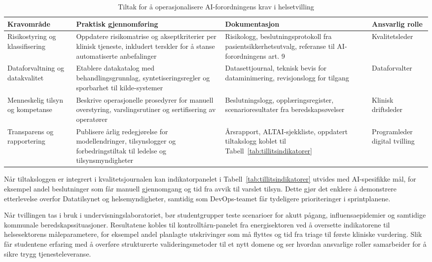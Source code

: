\begin{table}[ht]
    \centering
    \caption{Tiltak for å operasjonalisere AI-forordningens krav i helsetvilling}
    \label{tab:aiforordning-tiltak}
    \begin{tabular}{|p{3.3cm}|p{4.5cm}|p{4.5cm}|p{3.0cm}|}
        \hline
        \textbf{Kravområde} & \textbf{Praktisk gjennomføring} & \textbf{Dokumentasjon} & \textbf{Ansvarlig rolle} \\
        \hline
        Risikostyring og klassifisering & Oppdatere risikomatrise og akseptkriterier per klinisk tjeneste, inkludert terskler for å stanse automatiserte anbefalinger & Risikologg, beslutningsprotokoll fra pasientsikkerhetsutvalg, referanse til AI-forordningens art. 9 & Kvalitetsleder \citep{eu2024aiact} \\
        \hline
        Dataforvaltning og datakvalitet & Etablere datakatalog med behandlingsgrunnlag, syntetiseringsregler og sporbarhet til kilde-systemer & Datasettjournal, teknisk bevis for dataminimering, revisjonslogg for tilgang & Dataforvalter \citep{eu2024aiact} \\
        \hline
        Menneskelig tilsyn og kompetanse & Beskrive operasjonelle prosedyrer for manuell overstyring, varslingsrutiner og sertifisering av operatører & Beslutningslogg, opplæringsregister, scenarioresultater fra beredskapsøvelser & Klinisk driftsleder \citep{digdir2023styringai} \\
        \hline
        Transparens og rapportering & Publisere årlig redegjørelse for modellendringer, tilsynslogger og forbedringstiltak til ledelse og tilsynsmyndigheter & Årsrapport, ALTAI-sjekkliste, oppdatert tiltakslogg koblet til Tabell~\ref{tab:tillitsindikatorer} & Programleder digital tvilling \citep{ec2020trustworthyai} \\
        \hline
    \end{tabular}
\end{table}

Når tiltaksloggen er integrert i kvalitetsjournalen kan indikatorpanelet i Tabell~\ref{tab:tillitsindikatorer} utvides med AI-spesifikke mål, for eksempel andel beslutninger som får manuell gjennomgang og tid fra avvik til varslet tilsyn. Dette gjør det enklere å demonstrere etterlevelse overfor Datatilsynet og helsemyndigheter, samtidig som DevOps-teamet får tydeligere prioriteringer i sprintplanene.

Når tvillingen tas i bruk i undervisningslaboratoriet, bør studentgrupper teste scenarioer for akutt pågang, influensaepidemier og samtidige kommunale beredskapssituasjoner. Resultatene kobles til kontrolltårn-panelet fra energisektoren ved å oversette indikatorene til helsesektorens måleparametere, for eksempel andel planlagte utskrivinger som må flyttes og tid fra triage til første kliniske vurdering. Slik får studentene erfaring med å overføre strukturerte valideringsmetoder til et nytt domene og ser hvordan ansvarlige roller samarbeider for å sikre trygg tjenesteleveranse.

